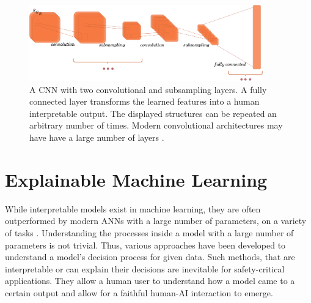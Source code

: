 \documentclass[a4paper,cleardoubleempty,BCOR1cm, 11pt]{report}
\begin{document}
\begin{figure}
	\centering
		\includegraphics[width=0.9\textwidth]{images/convnet.pdf} 
		\caption{A CNN with two convolutional and subsampling layers. A fully connected layer transforms the learned features into a human interpretable output. The displayed structures can be repeated an arbitrary number of times. Modern convolutional architectures may have have a large number of layers \cite{he2016deep,szegedy2015going,xie2017aggregated}.}
		\label{fig:convnet}
\end{figure}


\section{Explainable Machine Learning}
While interpretable models exist in machine learning, they are often outperformed by modern ANNs with a large number of parameters, on a variety of tasks \cite{gunning2019xai, guo2020explainable, sarkar2016accuracy, puiutta2020explainable}. Understanding the processes inside a model with a large number of parameters is not trivial. Thus, various approaches have been developed to understand a model's decision process for given data. Such methods, that are interpretable or can explain their decisions are inevitable for safety-critical applications. They allow a human user to understand how a model came to a certain output and allow for a faithful human-AI interaction to emerge.
\end{document}
